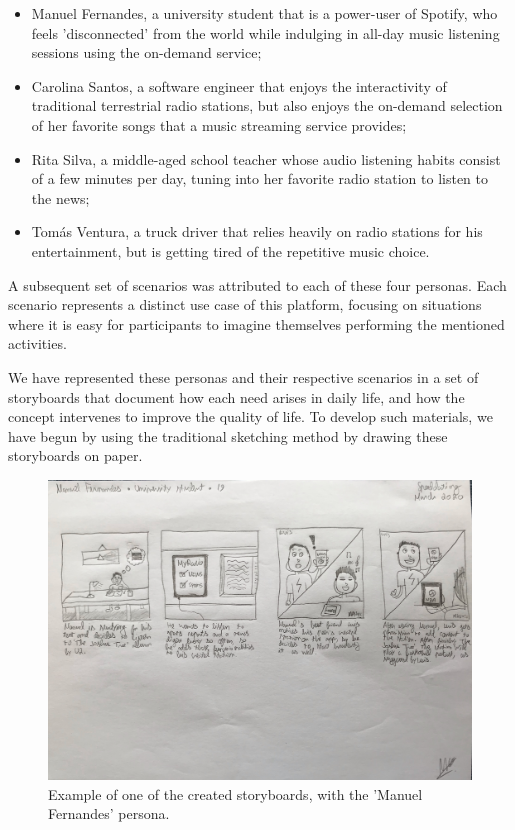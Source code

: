 \begin{itemize}
	\item Manuel Fernandes, a university student that is a power-user of Spotify, who feels 'disconnected' from the world while indulging in all-day music listening sessions using the on-demand service;
	\item Carolina Santos, a software engineer that enjoys the interactivity of traditional terrestrial radio stations, but also enjoys the on-demand selection of her favorite songs that a music streaming service provides;
	\item Rita Silva, a middle-aged school teacher whose audio listening habits consist of a few minutes per day, tuning into her favorite radio station to listen to the news;
	\item Tomás Ventura, a truck driver that relies heavily on radio stations for his entertainment, but is getting tired of the repetitive music choice.
\end{itemize}


A subsequent set of scenarios was attributed to each of these four personas. Each scenario represents a distinct use case of this platform, focusing on situations where it is easy for participants to imagine themselves performing the mentioned activities.

We have represented these personas and their respective scenarios in a set of storyboards that document how each need arises in daily life, and how the concept intervenes to improve the quality of life. To develop such materials, we have begun by using the traditional sketching method by drawing these storyboards on paper.

\begin{figure}[!h]
    \centering
    \includegraphics[width=\columnwidth]{./Images/storyboard.jpg}
    \caption{Example of one of the created storyboards, with the 'Manuel Fernandes' persona.}
    \label{fig:storyboard}
\end{figure}

